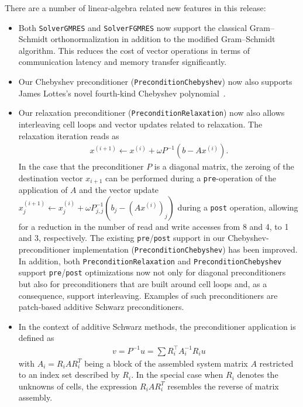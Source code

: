 \documentclass{ansarticle-preprint}
\begin{document}
There are a number of linear-algebra related new features in this release:
\begin{itemize}
  \item Both \texttt{SolverGMRES} and \texttt{SolverFGMRES} now support the classical
  Gram--Schmidt orthonormalization in addition to the modified Gram--Schmidt algorithm. This
  reduces the cost of vector operations in terms of
  communication latency and memory transfer significantly.
  \item Our Chebyshev preconditioner (\texttt{PreconditionChebyshev}) now also
  supports James Lottes’s novel fourth-kind Chebyshev
  polynomial~\cite{lottes2022optimal, phillips2022optimal}.
  \item Our relaxation preconditioner (\texttt{PreconditionRelaxation}) now also
  allows interleaving cell loops and vector updates related to relaxation. The
  relaxation iteration reads as
  \begin{align*}
  x^{(i+1)} \gets x^{(i)} + \omega P^{-1}(b-Ax^{(i)}).
  \end{align*}
  In the case that the preconditioner $P$ is a diagonal matrix, the zeroing of
  the destination vector $x_{i+1}$ can be performed during a
  \texttt{pre}-operation  of the application of $A$
  and the vector update $x^{(i+1)}_j \gets x^{(i)}_j + \omega P^{-1}_{j,j}(b_j-(Ax^{(i)})_j)$
  during a \texttt{post} operation, allowing for a reduction in the number of read and write
  accesses from 8 and 4, to 1 and 3, respectively. The existing \texttt{pre}/\texttt{post}
  support in our Chebyshev-preconditioner implementation (\texttt{PreconditionChebyshev})
  has been improved. In addition, both \texttt{PreconditionRelaxation} and 
  \texttt{PreconditionChebyshev} support \texttt{pre}/\texttt{post} optimizations
  now not only for diagonal preconditioners but also for preconditioners that are
  built around cell loops and, as a consequence, support interleaving. Examples of
  such preconditioners are patch-based additive Schwarz preconditioners.
  \item In the context of additive Schwarz methods, the preconditioner application
  is defined as
  \begin{align*}
  v = P^{-1} u = \sum R_i^\top A_i^{-1} R_i u 
  \end{align*}
  with $A_i = R_i A R_i^T$ being a block of the assembled system
  matrix $A$ restricted
  to an index set described by $R_i$. In the special case when $R_i$ denotes the unknowns
  of cells, the expression $R_i A R_i^T$ resembles the reverse of matrix
  assembly.

\end{itemize}
\end{document}
